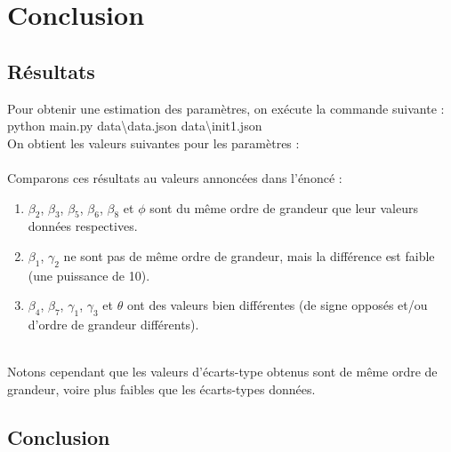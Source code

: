 \section{Conclusion}
\subsection{Résultats}
Pour obtenir une estimation des paramètres, on exécute la commande suivante :  \\
python main.py data\textbackslash data.json data\textbackslash init1.json \\
On obtient les valeurs suivantes pour les paramètres : \\
     \\

Comparons ces résultats au valeurs annoncées dans l'énoncé :
\begin{enumerate}
    \item $\beta_{2}$,  $\beta_{3}$,  $\beta_{5}$, $\beta_{6}$, $\beta_{8}$ et $\phi$ sont du même ordre de grandeur que leur valeurs données respectives.
    \item $\beta_{1}$, $\gamma_{2}$ ne sont pas de même ordre de grandeur, mais la différence est faible (une puissance de 10).
    \item $\beta_{4}$, $\beta_{7}$, $\gamma_{1}$, $\gamma_{3}$ et $\theta$ ont des valeurs bien différentes (de signe opposés et/ou d'ordre de grandeur différents).
\end{enumerate}
\\
Notons cependant que les valeurs d'écarts-type obtenus sont de même ordre de grandeur, voire plus faibles que les écarts-types données.
\subsection{Conclusion}

